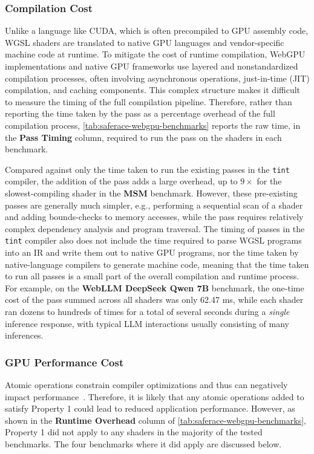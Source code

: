 \subsubsection{Compilation Cost}

Unlike a language like CUDA, which is often precompiled to GPU assembly code, WGSL shaders are translated to native GPU languages and vendor-specific machine code at runtime. To mitigate the cost of runtime compilation, WebGPU implementations and native GPU frameworks use layered and nonstandardized compilation processes, often involving asynchronous operations, just-in-time (JIT) compilation, and caching components. This complex structure makes it difficult to measure the timing of the full compilation pipeline. Therefore, rather than reporting the time taken by the pass as a percentage overhead of the full compilation process, \mytab\ref{tab:saferace-webgpu-benchmarks} reports the raw time, in the \textbf{Pass Timing} column, required to run the pass on the shaders in each benchmark.

Compared against only the time taken to run the existing passes in the \texttt{tint} compiler, the addition of the \smsg pass adds a large overhead, up to $9\times$ for the slowest-compiling shader in the \textbf{MSM} benchmark. However, these pre-existing passes are generally much simpler, e.g., performing a sequential scan of a shader and adding bounds-checks to memory accesses, while the \smsg pass requires relatively complex dependency analysis and program traversal. The timing of passes in the \texttt{tint} compiler also does not include the time required to parse WGSL programs into an IR and write them out to native GPU programs, nor the time taken by native-language compilers to generate machine code, meaning that the time taken to run all passes is a small part of the overall compilation and runtime process. For example, on the \textbf{WebLLM DeepSeek Qwen 7B} benchmark, the one-time cost of the \smsg pass summed across all shaders was only 62.47 ms, while each shader ran dozens to hundreds of times for a total of several seconds during a \textit{single} inference response, with typical LLM interactions usually consisting of many inferences.

\subsubsection{GPU Performance Cost}

Atomic operations constrain compiler optimizations and thus can negatively impact performance~\cite{schweizer2015atomiccost,burtchell2024characterizing}. Therefore, it is likely that any atomic operations added to satisfy \smsg Property 1 could lead to reduced application performance. However, as shown in the \textbf{Runtime Overhead} column of \mytab\ref{tab:saferace-webgpu-benchmarks}, \smsg Property 1 did not apply to any shaders in the majority of the tested benchmarks. The four benchmarks where it did apply are discussed below.

